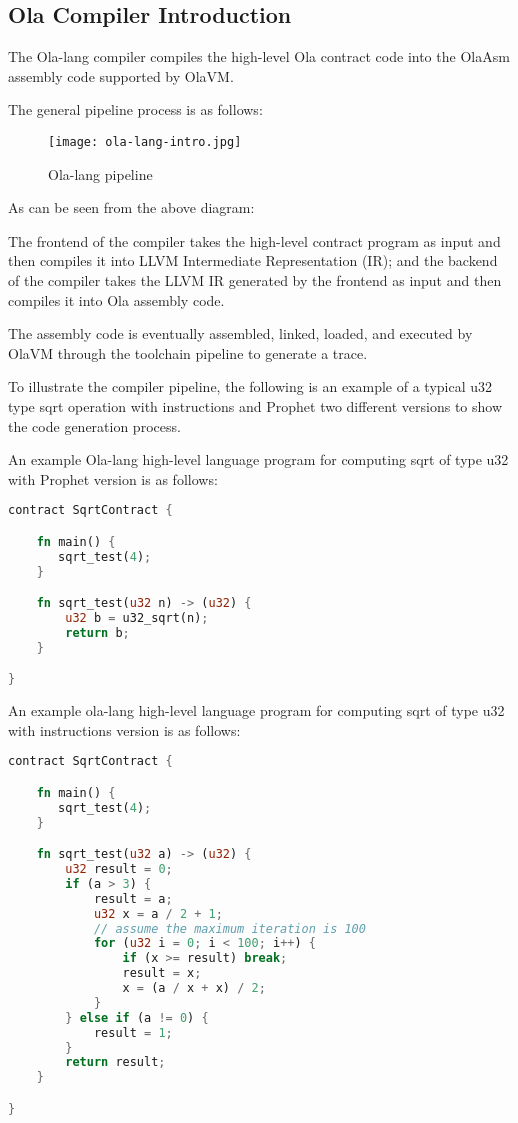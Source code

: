 \subsection{Ola Compiler Introduction}

The Ola-lang compiler compiles the high-level Ola contract code into the OlaAsm assembly code supported by OlaVM. 

The general pipeline process is as follows:

\begin{figure}[!htp]
    \centering
    \texttt{[image: ola-lang-intro.jpg]}
    \caption{Ola-lang pipeline}
    \label{fig:ola-lang-intro}
\end{figure}

As can be seen from the above diagram:

The frontend of the compiler takes the high-level contract program as input and then compiles it into LLVM Intermediate Representation (IR);
and the backend of the compiler takes the LLVM IR generated by the frontend as input and then compiles it into Ola assembly code.

The assembly code is eventually assembled, linked, loaded, and executed by OlaVM through the toolchain pipeline to generate a trace.


To illustrate the compiler pipeline, the following is an example of a typical u32 type sqrt operation with instructions and Prophet two different versions to show the code generation process.

An example Ola-lang high-level language program for computing sqrt of type u32 with Prophet version is as follows:
\begin{lstlisting}[language=rust]
contract SqrtContract {

    fn main() {
       sqrt_test(4);
    }

    fn sqrt_test(u32 n) -> (u32) {
        u32 b = u32_sqrt(n);
        return b;
    }

}
\end{lstlisting}


An example ola-lang high-level language program for computing sqrt of type u32 with instructions version is as follows:
\begin{lstlisting}[language=rust]
contract SqrtContract {

    fn main() {
       sqrt_test(4);
    }

    fn sqrt_test(u32 a) -> (u32) {
        u32 result = 0;
        if (a > 3) {
            result = a;
            u32 x = a / 2 + 1;
            // assume the maximum iteration is 100
            for (u32 i = 0; i < 100; i++) {
                if (x >= result) break;
                result = x;
                x = (a / x + x) / 2;
            }
        } else if (a != 0) {
            result = 1;
        }
        return result;
    }

}
\end{lstlisting}
